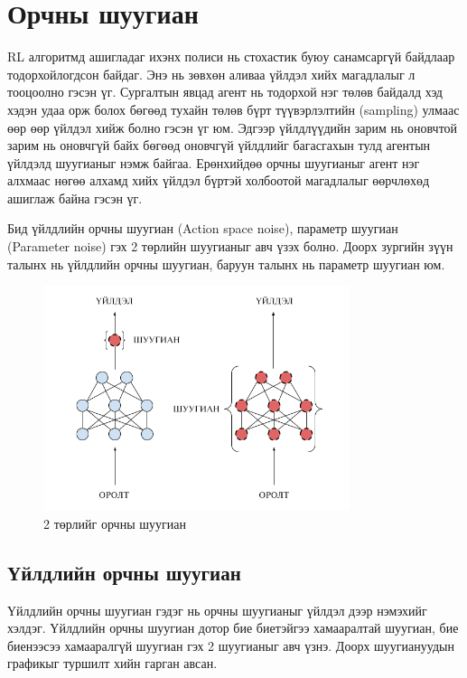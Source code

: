 \documentclass[12pt,A4]{report}
\begin{document}
\section{Орчны шуугиан}

RL алгоритмд ашигладаг ихэнх полиси нь стохастик буюу санамсаргүй байдлаар тодорхойлогдсон байдаг. Энэ нь зөвхөн аливаа үйлдэл хийх магадлалыг л тооцоолно гэсэн үг. Сургалтын явцад агент нь тодорхой нэг төлөв байдалд хэд хэдэн удаа орж болох бөгөөд тухайн төлөв бүрт түүвэрлэлтийн (sampling) улмаас өөр өөр үйлдэл хийж болно гэсэн үг юм. Эдгээр үйлдлүүдийн зарим нь оновчтой зарим нь оновчгүй байх бөгөөд оновчгүй үйлдлийг багасгахын тулд агентын үйлдэлд шуугианыг нэмж байгаа. Ерөнхийдөө орчны шуугианыг агент нэг алхмаас нөгөө алхамд хийх үйлдэл бүртэй холбоотой магадлалыг өөрчлөхөд ашиглаж байна гэсэн үг.

Бид үйлдлийн орчны шуугиан (Action space noise), параметр шуугиан (Parameter noise) гэх 2 төрлийн шуугианыг авч үзэх болно. Доорх зургийн зүүн талынх нь үйлдлийн орчны шуугиан, баруун талынх нь параметр шуугиан юм.

\begin{figure}[H]
\centering
\includegraphics[width=0.8\textwidth]{./images/p_diag_1}
\caption{2 төрлийг орчны шуугиан}
\end{figure}

\subsection{Үйлдлийн орчны шуугиан}

Үйлдлийн орчны шуугиан гэдэг нь орчны шуугианыг үйлдэл дээр нэмэхийг хэлдэг. Үйлдлийн орчны шуугиан дотор бие биетэйгээ хамааралтай шуугиан, бие биенээсээ хамааралгүй шуугиан гэх 2 шуугианыг авч үзнэ. Доорх шуугиануудын графикыг туршилт хийн гарган авсан.
\end{document}
